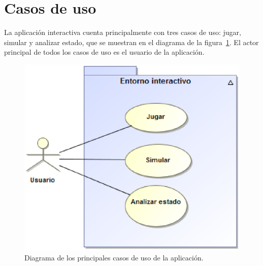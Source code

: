 \section{Casos de uso}
\label{sec:casos_uso}
La aplicación interactiva cuenta principalmente con tres casos de uso: jugar, simular y analizar estado, que se muestran en el diagrama de la figura~\ref{fig:casos_uso_principales}.
El actor principal de todos los casos de uso es el usuario de la aplicación.
\begin{figure}[h]
	\centering
	\includegraphics[scale=0.5]{contenido/cap5/imagenes/principales.eps}
	\caption{Diagrama de los principales casos de uso de la aplicación.}
	\label{fig:casos_uso_principales}
\end{figure}

